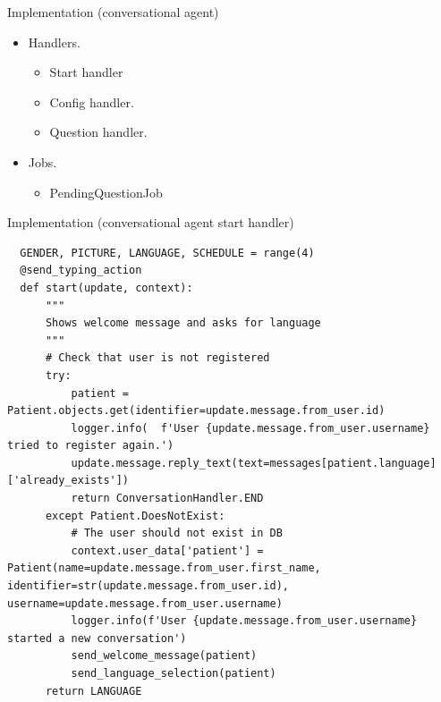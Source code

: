 \documentclass{beamer}
\begin{document}
\begin{frame}[fragile]{Implementation (conversational agent)}
  \begin{itemize}[<+->]
    \item Handlers.
          \begin{itemize}[<+->]
            \item Start handler
            \item Config handler.
            \item Question handler.
          \end{itemize}
        \item Jobs.
          \begin{itemize}[<+->]
            \item PendingQuestionJob
          \end{itemize}
  \end{itemize}
\end{frame}

\begin{frame}[fragile]{Implementation (conversational agent start handler)}
  \begin{verbatim}
  GENDER, PICTURE, LANGUAGE, SCHEDULE = range(4)
  @send_typing_action
  def start(update, context):
      """
      Shows welcome message and asks for language
      """
      # Check that user is not registered
      try:
          patient = Patient.objects.get(identifier=update.message.from_user.id)
          logger.info(  f'User {update.message.from_user.username} tried to register again.')
          update.message.reply_text(text=messages[patient.language]['already_exists'])
          return ConversationHandler.END
      except Patient.DoesNotExist:
          # The user should not exist in DB
          context.user_data['patient'] = Patient(name=update.message.from_user.first_name, identifier=str(update.message.from_user.id), username=update.message.from_user.username)
          logger.info(f'User {update.message.from_user.username} started a new conversation')
          send_welcome_message(patient)
          send_language_selection(patient)
      return LANGUAGE
\end{verbatim}
\end{frame}
\end{document}
